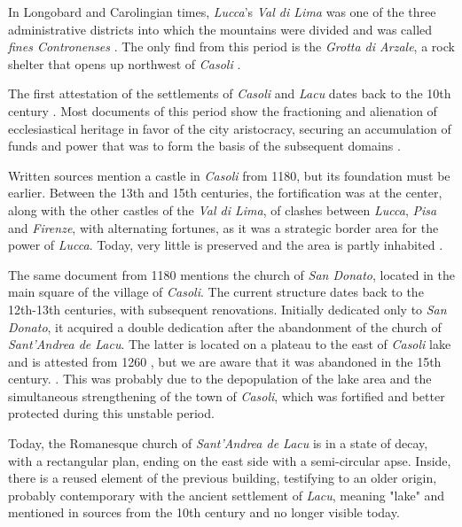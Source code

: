 \documentclass[sustainability,article,submit,pdftex,moreauthors]{Definitions/mdpi}
\begin{document}
In Longobard and Carolingian times, \emph{Lucca}'s \emph{Val di Lima} was one of the three administrative districts into which the mountains were divided and was called \emph{fines Contronenses} \cite{qui02, cia06, cia11}. The only find from this period is the \textit{Grotta di Arzale}, a rock shelter that opens up northwest of \emph{Casoli} \cite{gia96}.

The first attestation of the settlements of \emph{Casoli} and \emph{Lacu} dates back to the 10th century \cite{gia96}. Most documents of this period show the fractioning and alienation of ecclesiastical heritage in favor of the city aristocracy, securing an accumulation of funds and power that was to form the basis of the subsequent domains \cite{qui02, gia96, for12, for15}.

Written sources mention a castle in \emph{Casoli} from 1180, but its foundation must be earlier. Between the 13th and 15th centuries, the fortification was at the center, along with the other castles of the \emph{Val di Lima}, of clashes between \emph{Lucca}, \textit{Pisa} and \emph{Firenze}, with alternating fortunes, as it was a strategic border area for the power of \emph{Lucca}. Today, very little is preserved and the area is partly inhabited \cite{gia96, for12, rom16}.

The same document from 1180 mentions the church of \textit{San Donato}, located in the main square of the village of \emph{Casoli}. The current structure dates back to the 12th-13th centuries, with subsequent renovations. Initially dedicated only to \textit{San Donato}, it acquired a double dedication after the abandonment of the church of \textit{Sant'Andrea de Lacu}. The latter is located on a plateau to the east of \emph{Casoli} lake and is attested from 1260 \cite{ber18, gia96, cap17}, but we are aware that it was abandoned in the 15th century. \cite{gia96, con12}. This was probably due to the depopulation of the lake area and the simultaneous strengthening of the town of \emph{Casoli}, which was fortified and better protected during this unstable period.

Today, the Romanesque church of \textit{Sant'Andrea de Lacu} is in a state of decay, with a rectangular plan, ending on the east side with a semi-circular apse. Inside, there is a reused element of the previous building, testifying to an older origin, probably contemporary with the ancient settlement of \textit{Lacu}, meaning "lake" and mentioned in sources from the 10th century and no longer visible today.
\end{document}
